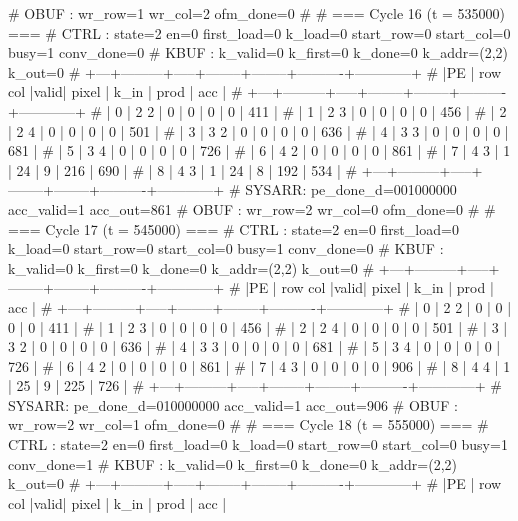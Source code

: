 # OBUF : wr_row=1 wr_col=2 ofm_done=0
# 
# === Cycle 16  (t = 535000) ===
# CTRL : state=2 en=0 first_load=0 k_load=0 start_row=0 start_col=0 busy=1 conv_done=0
# KBUF : k_valid=0 k_first=0 k_done=0 k_addr=(2,2) k_out=0
# +---+---------+-----+--------+--------+----------+------------+
# |PE | row col |valid| pixel  |  k_in  |   prod   |    acc     |
# +---+---------+-----+--------+--------+----------+------------+
# | 0 |   2   2 |  0  |      0 |      0 |        0 |        411 |
# | 1 |   2   3 |  0  |      0 |      0 |        0 |        456 |
# | 2 |   2   4 |  0  |      0 |      0 |        0 |        501 |
# | 3 |   3   2 |  0  |      0 |      0 |        0 |        636 |
# | 4 |   3   3 |  0  |      0 |      0 |        0 |        681 |
# | 5 |   3   4 |  0  |      0 |      0 |        0 |        726 |
# | 6 |   4   2 |  0  |      0 |      0 |        0 |        861 |
# | 7 |   4   3 |  1  |     24 |      9 |      216 |        690 |
# | 8 |   4   3 |  1  |     24 |      8 |      192 |        534 |
# +---+---------+-----+--------+--------+----------+------------+
# SYSARR: pe_done_d=001000000 acc_valid=1 acc_out=861
# OBUF : wr_row=2 wr_col=0 ofm_done=0
# 
# === Cycle 17  (t = 545000) ===
# CTRL : state=2 en=0 first_load=0 k_load=0 start_row=0 start_col=0 busy=1 conv_done=0
# KBUF : k_valid=0 k_first=0 k_done=0 k_addr=(2,2) k_out=0
# +---+---------+-----+--------+--------+----------+------------+
# |PE | row col |valid| pixel  |  k_in  |   prod   |    acc     |
# +---+---------+-----+--------+--------+----------+------------+
# | 0 |   2   2 |  0  |      0 |      0 |        0 |        411 |
# | 1 |   2   3 |  0  |      0 |      0 |        0 |        456 |
# | 2 |   2   4 |  0  |      0 |      0 |        0 |        501 |
# | 3 |   3   2 |  0  |      0 |      0 |        0 |        636 |
# | 4 |   3   3 |  0  |      0 |      0 |        0 |        681 |
# | 5 |   3   4 |  0  |      0 |      0 |        0 |        726 |
# | 6 |   4   2 |  0  |      0 |      0 |        0 |        861 |
# | 7 |   4   3 |  0  |      0 |      0 |        0 |        906 |
# | 8 |   4   4 |  1  |     25 |      9 |      225 |        726 |
# +---+---------+-----+--------+--------+----------+------------+
# SYSARR: pe_done_d=010000000 acc_valid=1 acc_out=906
# OBUF : wr_row=2 wr_col=1 ofm_done=0
# 
# === Cycle 18  (t = 555000) ===
# CTRL : state=2 en=0 first_load=0 k_load=0 start_row=0 start_col=0 busy=1 conv_done=1
# KBUF : k_valid=0 k_first=0 k_done=0 k_addr=(2,2) k_out=0
# +---+---------+-----+--------+--------+----------+------------+
# |PE | row col |valid| pixel  |  k_in  |   prod   |    acc     |
